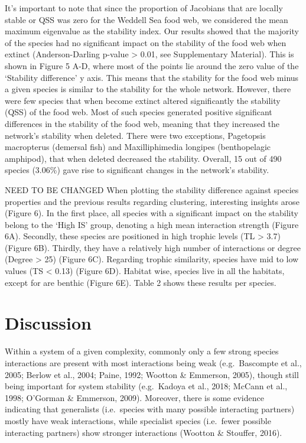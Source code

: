 \documentclass[gc, manuscript]{copernicus}
\begin{document}
It's important to note that since the proportion of Jacobians that are
locally stable or QSS was zero for the Weddell Sea food web, we
considered the mean maximum eigenvalue as the stability index. Our
results showed that the majority of the species had no significant
impact on the stability of the food web when extinct (Anderson-Darling
p-value \textgreater{} 0.01, see Supplementary Material). This is shown
in Figure 5 A-D, where most of the points lie around the zero value of
the `Stability difference' y axis. This means that the stability for the
food web minus a given species is similar to the stability for the whole
network. However, there were few species that when become extinct
altered significantly the stability (QSS) of the food web. Most of such
species generated positive significant differences in the stability of
the food web, meaning that they increased the network's stability when
deleted. There were two exceptions, Pagetopsis macropterus (demersal
fish) and Maxilliphimedia longipes (benthopelagic amphipod), that when
deleted decreased the stability. Overall, 15 out of 490 species (3.06\%)
gave rise to significant changes in the network's stability.

NEED TO BE CHANGED When plotting the stability difference against
species properties and the previous results regarding clustering,
interesting insights arose (Figure 6). In the first place, all species
with a significant impact on the stability belong to the `High IS'
group, denoting a high mean interaction strength (Figure 6A). Secondly,
these species are positioned in high trophic levels (TL \textgreater{}
3.7) (Figure 6B). Thirdly, they have a relatively high number of
interactions or degree (Degree \textgreater{} 25) (Figure 6C). Regarding
trophic similarity, species have mid to low values (TS \textless{} 0.13)
(Figure 6D). Habitat wise, species live in all the habitats, except for
are benthic (Figure 6E). Table 2 shows these results per species.

\section{Discussion}

Within a system of a given complexity, commonly only a few strong
species interactions are present with most interactions being weak
(e.g.~Bascompte et al., 2005; Berlow et al., 2004; Paine, 1992; Wootton
\& Emmerson, 2005), though still being important for system stability
(e.g.~Kadoya et al., 2018; McCann et al., 1998; O'Gorman \& Emmerson,
2009). Moreover, there is some evidence indicating that generalists
(i.e.~species with many possible interacting partners) mostly have weak
interactions, while specialist species (i.e.~fewer possible interacting
partners) show stronger interactions (Wootton \& Stouffer, 2016).
\end{document}
